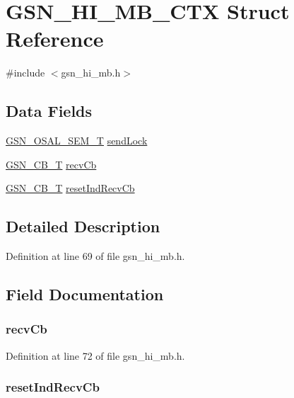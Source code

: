 \hypertarget{a00089}{
\section{GSN\_\-HI\_\-MB\_\-CTX Struct Reference}
\label{a00089}
}


{\ttfamily \#include $<$gsn\_\-hi\_\-mb.h$>$}

\subsection*{Data Fields}
\begin{DoxyCompactItemize}
\item 
\hyperlink{a00628_gab4b3554407ce22b940e2fcd3faf5fd47}{GSN\_\-OSAL\_\-SEM\_\-T} \hyperlink{a00089_ab0b7abdc981e00b9cfe9138cde2cbaf3}{sendLock}
\item 
\hyperlink{a00036}{GSN\_\-CB\_\-T} \hyperlink{a00089_a2083a40632777989cb6d9d499c005e64}{recvCb}
\item 
\hyperlink{a00036}{GSN\_\-CB\_\-T} \hyperlink{a00089_a1b244a7fecc4ad48606d6b3e53db7315}{resetIndRecvCb}
\end{DoxyCompactItemize}


\subsection{Detailed Description}


Definition at line 69 of file gsn\_\-hi\_\-mb.h.



\subsection{Field Documentation}
\hypertarget{a00089_a2083a40632777989cb6d9d499c005e64}{
\subsubsection[{recvCb}]{ {\bf recvCb}}}
\label{a00089_a2083a40632777989cb6d9d499c005e64}


Definition at line 72 of file gsn\_\-hi\_\-mb.h.

\hypertarget{a00089_a1b244a7fecc4ad48606d6b3e53db7315}{
\subsubsection[{resetIndRecvCb}]{ {\bf resetIndRecvCb}}}
\label{a00089_a1b244a7fecc4ad48606d6b3e53db7315}


